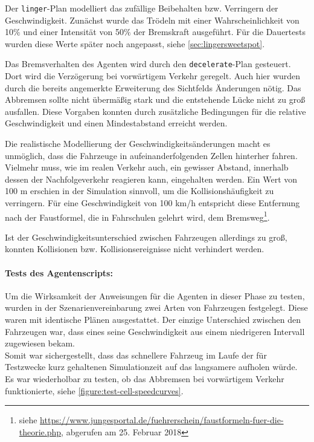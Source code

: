 Der \texttt{linger}-Plan modelliert das zufällige Beibehalten bzw. Verringern der Geschwindigkeit. 
Zunächst wurde das Trödeln mit einer Wahrscheinlichkeit von \mbox{10$\%$} und einer Intensität von \mbox{50$\%$} der Bremskraft ausgeführt.
Für die Dauertests wurden diese Werte später noch angepasst, siehe \cref{sec:lingersweetspot}.

Das Bremsverhalten des Agenten wird durch den \texttt{decelerate}-Plan gesteuert. 
Dort wird die Verzögerung bei vorwärtigem Verkehr geregelt.
Auch hier wurden durch die bereits angemerkte Erweiterung des Sichtfelds Änderungen nötig. 
Das Abbremsen sollte nicht übermäßig stark und die entstehende Lücke nicht zu groß ausfallen. 
Diese Vorgaben konnten durch zusätzliche Bedingungen für die relative Geschwindigkeit und einen Mindestabstand erreicht werden.

Die realistische Modellierung der Geschwindigkeitsänderungen macht es unmöglich, dass die Fahrzeuge in aufeinanderfolgenden Zellen hinterher fahren.
Vielmehr muss, wie im realen Verkehr auch, ein gewisser Abstand, innerhalb dessen der Nachfolgeverkehr reagieren kann, eingehalten werden.
Ein Wert von 100 m erschien in der Simulation sinnvoll, um die Kollisionshäufigkeit zu verringern. 
Für eine Geschwindigkeit von 100 km/h entspricht diese Entfernung nach der Faustformel, die in Fahrschulen gelehrt wird, dem Bremsweg\footnote{siehe \url{https://www.jungesportal.de/fuehrerschein/faustformeln-fuer-die-theorie.php}, abgerufen am 25. Februar 2018}.

Ist der Geschwindigkeitsunterschied zwischen Fahrzeugen allerdings zu groß, konnten Kollisionen bzw. Kollisionsereignisse nicht verhindert werden.

\paragraph*{Tests des Agentenscripts:}
Um die Wirksamkeit der Anweisungen für die Agenten in dieser Phase zu testen, wurden in der Szenarienvereinbarung zwei Arten von Fahrzeugen festgelegt.
Diese waren mit identische Plänen ausgestattet.
Der einzige Unterschied zwischen den Fahrzeugen war, dass eines seine Geschwindigkeit aus einem niedrigeren Intervall zugewiesen bekam.
\\
Somit war sichergestellt, dass das schnellere Fahrzeug im Laufe der für Testzwecke kurz gehaltenen Simulationzeit auf das langsamere aufholen würde.
Es war wiederholbar zu testen, ob das Abbremsen bei vorwärtigem Verkehr funktionierte, siehe \cref{figure:test-cell-speedcurves}.

